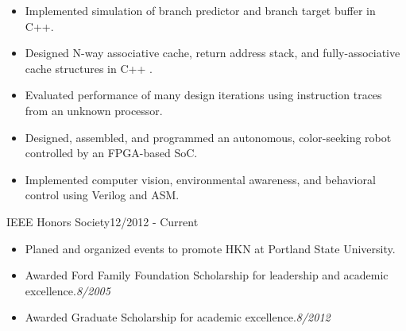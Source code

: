 \documentclass{article}
\begin{document}
		\begin{itemize} \setlength{\itemsep}{-4pt}
			\item Implemented simulation of branch predictor and branch target buffer in C++.
			\item Designed N-way associative cache, return address stack, and fully-associative cache structures in C++	.
			\item Evaluated performance of many design iterations using instruction traces from an unknown processor.
		\end{itemize}	
	
	
	\begin{itemize}\setlength{\itemsep}{-4pt}
		\item Designed, assembled, and programmed an autonomous, color-seeking robot controlled by an FPGA-based SoC.  
		\item Implemented computer vision, environmental awareness, and behavioral control using Verilog and ASM.
	\end{itemize}

		
\vspace{-10pt}
\vspace{3pt}

 {IEEE Honors Society}{12/2012 - Current}

	\begin{itemize} \setlength{\itemsep}{-4pt}	
		\item Planed and organized events to promote HKN at Portland State University.
	\end{itemize}	\vspace{-2pt}


	\begin{itemize} \setlength{\itemsep}{-4pt}
		\item Awarded Ford Family Foundation Scholarship for leadership and academic excellence.\hfill\emph{8/2005}
		\item Awarded Graduate Scholarship for academic excellence.\hfill\emph{8/2012}
	\end{itemize}
\end{document}
